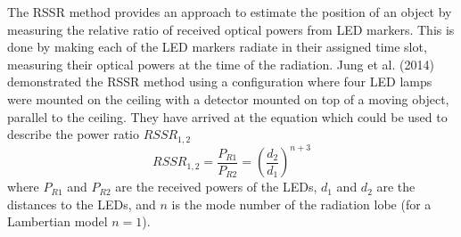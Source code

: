 The \ac{RSSR} method provides an approach to estimate the position of an object by measuring the relative ratio of received optical powers from \ac{LED}
markers. This is done by making each of the \ac{LED} markers radiate in their assigned time slot, measuring their optical powers at the time of the
radiation. Jung et al. (2014)~\cite{sooyongrssr} demonstrated the \ac{RSSR} method using a configuration where four LED lamps were mounted on the ceiling
with a detector mounted on top of a moving object, parallel to the ceiling.
They have arrived at the equation  which could be used to describe the power ratio $RSSR_{1,2}$
\begin{equation}
RSSR_{1,2} = \frac{P_{R1}}{P_{R2}} = \left( \frac{d_2}{d_1} \right)^{n+3}
\label{eq:rssr}
\end{equation}
where $P_{R1}$ and $P_{R2}$ are the received powers of the \ac{LED}s, $d_1$ and $d_2$ are the distances to the \ac{LED}s, and $n$ is the mode number of the radiation lobe (for a Lambertian model $n = 1$).

